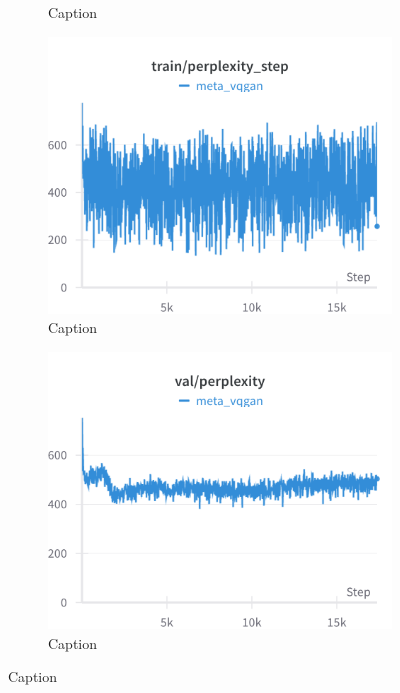 \begin{figure}[H]
\begin{subfigure}[h]{.45\linewidth}
    \caption{Caption}
    \label{fig:enter-label}
\end{subfigure}
\hfill
\begin{subfigure}[h]{.45\linewidth}
    \includegraphics[width=\linewidth]{detailed_engineering/Meta VQGAN/charts/train_perplexity_step.png}
    \caption{Caption}
    \label{fig:enter-label}
\end{subfigure}
\hfill
\begin{subfigure}[h]{.45\linewidth}
    \includegraphics[width=\linewidth]{detailed_engineering/Meta VQGAN/charts/val_perplexity.png}
    \caption{Caption}
    \label{fig:enter-label}

\end{subfigure}
\end{figure}
